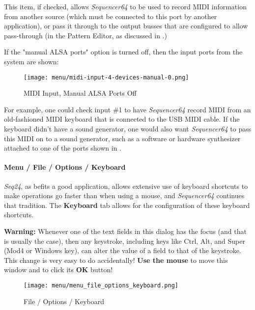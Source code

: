    This item, if checked, allows \textsl{Sequencer64} to be used to record MIDI
   information from another source (which must be connected to this port by
   another application), or pass it through to the output busses
   that are configured to allow pass-through
   (in the Pattern Editor, as discussed in 
   .)

   If the "manual ALSA ports" option is turned off, then
   the input ports from the system are shown:

\begin{figure}[H]
   \centering 
   \texttt{[image: menu/midi-input-4-devices-manual-0.png]}
   \caption{MIDI Input, Manual ALSA Ports Off}
   \label{fig:seq64_midi_input_4_devices_manual_0}
\end{figure}

   For example, one could check input \#1 to have \textsl{Sequencer64} record
   MIDI from an old-fashioned MIDI keyboard that is connected to the USB MIDI
   cable.  If the keyboard didn't have a sound generator, one would also want
   \textsl{Sequencer64} to pass this MIDI on to a sound generator, such as a
   software or hardware synthesizer attached to one of the ports shown in
   .

\paragraph{Menu / File / Options / Keyboard }
\label{paragraph:seq64_menu_file_options_keyboard}

   \textsl{Seq24}, as befits a good application, allows extensive use of
   keyboard shortcuts to make operations go faster than when using a mouse,
   and \textsl{Sequencer64} continues that tradition.
   The \textbf{Keyboard} tab allows for the configuration of these keyboard
   shortcuts.

   \textbf{Warning:}
   Whenever one of the text fields in this dialog has the focus (and that is
   usually the case), then any keystroke, including keys like Ctrl, Alt,
   and Super (Mod4 or Windows key), can alter the value of a field to that
   of the keystroke.  This change is very easy to do accidentally!
   \textbf{Use the mouse}
   to move this window and to click its \textbf{OK} button!

\begin{figure}[H]
   \centering 
   \texttt{[image: menu/menu\_file\_options\_keyboard.png]}
   \caption{File / Options / Keyboard}
   \label{fig:seq64_menu_file_options_keyboard}
\end{figure}

